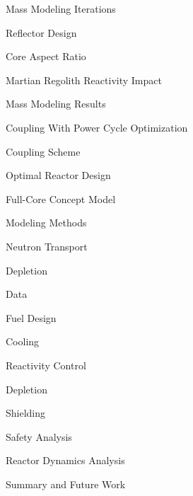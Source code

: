 \documentclass{report}
\begin{document}
\begin{outline}
\begin{outline}
\begin{outline}
          \end{outline}
          \item { Mass Modeling Iterations }
              \begin{outline}
              \item { Reflector Design }
              \item { Core Aspect Ratio }
              \item { Martian Regolith Reactivity Impact }
              \end{outline}
          \item { Mass Modeling Results }
      \end{outline}
  \item { Coupling With Power Cycle Optimization }
        \begin{outline}
        \item { Coupling Scheme }
        \item { Optimal Reactor Design }
        \end{outline}
  \item { Full-Core Concept Model }
        \begin{outline}
        \item { Modeling Methods }
            \begin{outline}
            \item { Neutron Transport }
            \item { Depletion }
            \item { Data }
            \end{outline}
        \item { Fuel Design }
        \item { Cooling }
        \item { Reactivity Control }
        \item { Depletion }
        \item { Shielding }
        \item { Safety Analysis }
        \item { Reactor Dynamics Analysis }
        \end{outline}
  \item { Summary and Future Work }
\end{outline}
\end{document}
